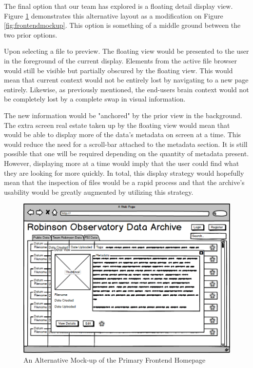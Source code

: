 \documentclass[12pt]{report}
\begin{document}
\begin{enumerate}
The final option that our team has explored is a floating detail display view. Figure \ref{fig:frontendfloating} demonstrates this alternative layout as a modification on Figure \ref{fig:frontendmockup}. This option is something of a middle ground between the two prior options.

Upon selecting a file to preview. The floating view would be presented to the user in the foreground of the current display. Elements from the active file browser would still be visible but partially obscured by the floating view. This would mean that current context would not be entirely lost by navigating to a new page entirely. Likewise, as previously mentioned, the end-users brain context would not be completely lost by a complete swap in visual information.

The new information would be "anchored" by the prior view in the background. The extra screen real estate taken up by the floating view would mean that would be able to display more of the data's metadata on screen at a time. This would reduce the need for a scroll-bar attached to the metadata section. It is still possible that one will be required depending on the quantity of metadata present. However, displaying more at a time would imply that the user could find what they are looking for more quickly. In total, this display strategy would hopefully mean that the inspection of files would be a rapid process and that the archive's usability would be greatly augmented by utilizing this strategy.

\begin{figure}[h]
	\centering
	\includegraphics[width=\linewidth]{frontend_floating}
	\caption{An Alternative Mock-up of the Primary Frontend Homepage}
	\label{fig:frontendfloating}
\end{figure}


\end{enumerate}
\end{document}
